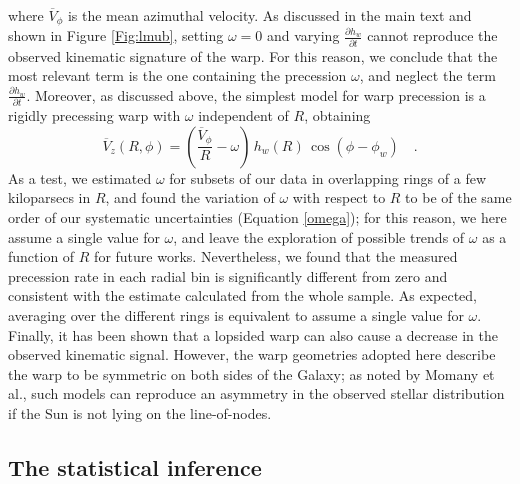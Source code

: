 \documentclass{nature}
\begin{document}
\begin{methods}
\begin {equation}
\end{equation}
where $\overline{V}_\phi $ is the mean azimuthal velocity. As discussed in the main text and shown in Figure \ref{Fig:lmub}, setting $\omega = 0$ and varying $\frac{ \partial h_w}{\partial t}$ cannot reproduce the observed kinematic signature of the warp. For this reason, we conclude that the most relevant term is the one containing the precession $\omega$, and neglect the term $\frac{ \partial h_w}{\partial t}$. Moreover, as discussed above, the simplest model for warp precession is a rigidly precessing warp with $\omega$ independent of $R$, obtaining
%
\begin {equation} 
\label{vz_precessing} 
\overline{V}_{z} (R,\phi)=\left(\frac{\overline{V}_\phi}{R} - \omega \right) \, h_w(R) \, \cos{( \phi - \phi_w)} \quad.
\end{equation}
As a test, we estimated $\omega$ for subsets of our data in overlapping rings of a few kiloparsecs in $R$, and found the variation of $\omega$ with respect to $R$ to be of the same order of our systematic uncertainties (Equation \ref{omega}); for this reason, we here assume a single value for $\omega$, and leave the exploration of possible trends of $\omega$ as a function of $R$ for future works. Nevertheless, we found that the measured precession rate in each radial bin is significantly different from zero and consistent with the estimate calculated from the whole sample. As expected, averaging over the different rings is equivalent to assume a single value for $\omega$. Finally, it has been shown that a lopsided warp can also cause a decrease in the observed kinematic signal\cite{Romero:2019}. However, the warp geometries adopted here describe the warp to be symmetric on both sides of the Galaxy; as noted by Momany et al.\cite{Momany:2006}, such models can reproduce an asymmetry in the observed stellar distribution if the Sun is not lying on the line-of-nodes\cite{Yusifov:2004,Chen:2019,Romero:2019}.

\subsection{The statistical inference}


\end{methods}
\end{document}
